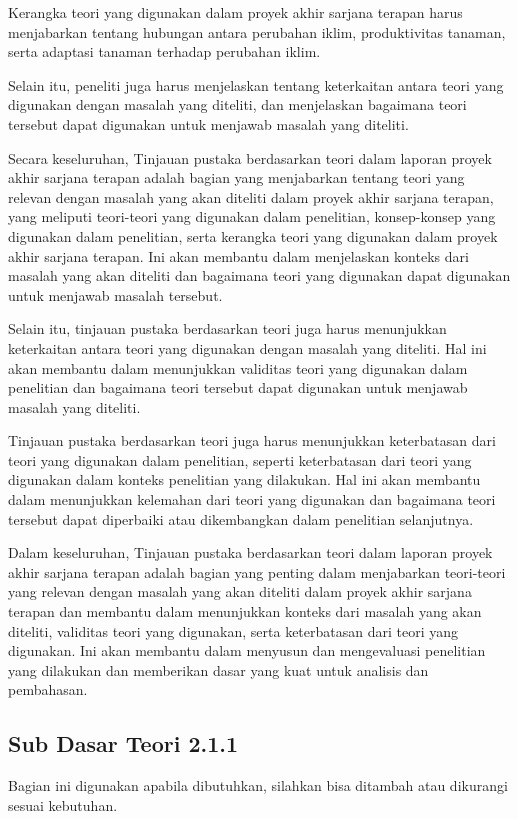 Kerangka teori yang digunakan dalam proyek akhir sarjana terapan harus menjabarkan tentang hubungan antara perubahan iklim, produktivitas tanaman, serta adaptasi tanaman terhadap perubahan iklim.

Selain itu, peneliti juga harus menjelaskan tentang keterkaitan antara teori yang digunakan dengan masalah yang diteliti, dan menjelaskan bagaimana teori tersebut dapat digunakan untuk menjawab masalah yang diteliti.

Secara keseluruhan, Tinjauan pustaka berdasarkan teori dalam laporan proyek akhir sarjana terapan adalah bagian yang menjabarkan tentang teori yang relevan dengan masalah yang akan diteliti dalam proyek akhir sarjana terapan, yang meliputi teori-teori yang digunakan dalam penelitian, konsep-konsep yang digunakan dalam penelitian, serta kerangka teori yang digunakan dalam proyek akhir sarjana terapan. Ini akan membantu dalam menjelaskan konteks dari masalah yang akan diteliti dan bagaimana teori yang digunakan dapat digunakan untuk menjawab masalah tersebut.

Selain itu, tinjauan pustaka berdasarkan teori juga harus menunjukkan keterkaitan antara teori yang digunakan dengan masalah yang diteliti. Hal ini akan membantu dalam menunjukkan validitas teori yang digunakan dalam penelitian dan bagaimana teori tersebut dapat digunakan untuk menjawab masalah yang diteliti.

Tinjauan pustaka berdasarkan teori juga harus menunjukkan keterbatasan dari teori yang digunakan dalam penelitian, seperti keterbatasan dari teori yang digunakan dalam konteks penelitian yang dilakukan. Hal ini akan membantu dalam menunjukkan kelemahan dari teori yang digunakan dan bagaimana teori tersebut dapat diperbaiki atau dikembangkan dalam penelitian selanjutnya.

Dalam keseluruhan, Tinjauan pustaka berdasarkan teori dalam laporan proyek akhir sarjana terapan adalah bagian yang penting dalam menjabarkan teori-teori yang relevan dengan masalah yang akan diteliti dalam proyek akhir sarjana terapan dan membantu dalam menunjukkan konteks dari masalah yang akan diteliti, validitas teori yang digunakan, serta keterbatasan dari teori yang digunakan. Ini akan membantu dalam menyusun dan mengevaluasi penelitian yang dilakukan dan memberikan dasar yang kuat untuk analisis dan pembahasan.

\subsection{Sub Dasar Teori 2.1.1}
Bagian ini digunakan apabila dibutuhkan, silahkan bisa ditambah atau dikurangi sesuai kebutuhan.

